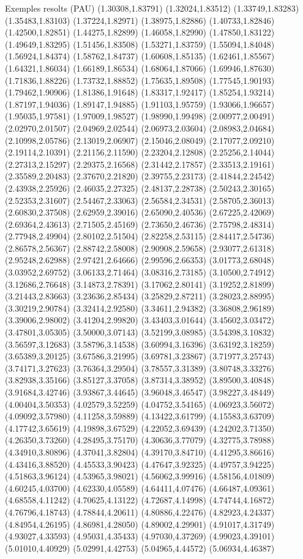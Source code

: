\documentclass[11pt,a4paper]{article}
\begin{document}
\begin{fmex}{Exemples resolts (PAU)}
(1.30308,1.83791) (1.32024,1.83512) (1.33749,1.83283) (1.35483,1.83103) (1.37224,1.82971) (1.38975,1.82886) (1.40733,1.82846) (1.42500,1.82851) (1.44275,1.82899) (1.46058,1.82990) (1.47850,1.83122) (1.49649,1.83295) (1.51456,1.83508) (1.53271,1.83759) (1.55094,1.84048) (1.56924,1.84374) (1.58762,1.84737) (1.60608,1.85135) (1.62461,1.85567) (1.64321,1.86034) (1.66189,1.86534) (1.68064,1.87066) (1.69946,1.87630) (1.71836,1.88226) (1.73732,1.88852) (1.75635,1.89508) (1.77545,1.90193) (1.79462,1.90906) (1.81386,1.91648) (1.83317,1.92417) (1.85254,1.93214) (1.87197,1.94036) (1.89147,1.94885) (1.91103,1.95759) (1.93066,1.96657) (1.95035,1.97581) (1.97009,1.98527) (1.98990,1.99498) (2.00977,2.00491) (2.02970,2.01507) (2.04969,2.02544) (2.06973,2.03604) (2.08983,2.04684) (2.10998,2.05786) (2.13019,2.06907) (2.15046,2.08049) (2.17077,2.09210) (2.19114,2.10391) (2.21156,2.11590) (2.23204,2.12808) (2.25256,2.14044) (2.27313,2.15297) (2.29375,2.16568) (2.31442,2.17857) (2.33513,2.19161) (2.35589,2.20483) (2.37670,2.21820) (2.39755,2.23173) (2.41844,2.24542) (2.43938,2.25926) (2.46035,2.27325) (2.48137,2.28738) (2.50243,2.30165) (2.52353,2.31607) (2.54467,2.33063) (2.56584,2.34531) (2.58705,2.36013) (2.60830,2.37508) (2.62959,2.39016) (2.65090,2.40536) (2.67225,2.42069) (2.69364,2.43613) (2.71505,2.45169) (2.73650,2.46736) (2.75798,2.48314) (2.77948,2.49904) (2.80102,2.51504) (2.82258,2.53115) (2.84417,2.54736) (2.86578,2.56367) (2.88742,2.58008) (2.90908,2.59658) (2.93077,2.61318) (2.95248,2.62988) (2.97421,2.64666) (2.99596,2.66353) (3.01773,2.68048) (3.03952,2.69752) (3.06133,2.71464) (3.08316,2.73185) (3.10500,2.74912) (3.12686,2.76648) (3.14873,2.78391) (3.17062,2.80141) (3.19252,2.81899) (3.21443,2.83663) (3.23636,2.85434) (3.25829,2.87211) (3.28023,2.88995) (3.30219,2.90784) (3.32414,2.92580) (3.34611,2.94382) (3.36808,2.96189) (3.39006,2.98002) (3.41204,2.99820) (3.43403,3.01644) (3.45602,3.03472) (3.47801,3.05305) (3.50000,3.07143) (3.52199,3.08985) (3.54398,3.10832) (3.56597,3.12683) (3.58796,3.14538) (3.60994,3.16396) (3.63192,3.18259) (3.65389,3.20125) (3.67586,3.21995) (3.69781,3.23867) (3.71977,3.25743) (3.74171,3.27623) (3.76364,3.29504) (3.78557,3.31389) (3.80748,3.33276) (3.82938,3.35166) (3.85127,3.37058) (3.87314,3.38952) (3.89500,3.40848) (3.91684,3.42746) (3.93867,3.44645) (3.96048,3.46547) (3.98227,3.48449) (4.00404,3.50353) (4.02579,3.52259) (4.04752,3.54165) (4.06923,3.56072) (4.09092,3.57980) (4.11258,3.59889) (4.13422,3.61799) (4.15583,3.63709) (4.17742,3.65619) (4.19898,3.67529) (4.22052,3.69439) (4.24202,3.71350) (4.26350,3.73260) (4.28495,3.75170) (4.30636,3.77079) (4.32775,3.78988) (4.34910,3.80896) (4.37041,3.82804) (4.39170,3.84710) (4.41295,3.86616) (4.43416,3.88520) (4.45533,3.90423) (4.47647,3.92325) (4.49757,3.94225) (4.51863,3.96124) (4.53965,3.98021) (4.56062,3.99916) (4.58156,4.01809) (4.60245,4.03700) (4.62330,4.05589) (4.64411,4.07476) (4.66487,4.09361) (4.68558,4.11242) (4.70625,4.13122) (4.72687,4.14998) (4.74744,4.16872) (4.76796,4.18743) (4.78844,4.20611) (4.80886,4.22476) (4.82923,4.24337) (4.84954,4.26195) (4.86981,4.28050) (4.89002,4.29901) (4.91017,4.31749) (4.93027,4.33593) (4.95031,4.35433) (4.97030,4.37269) (4.99023,4.39101) (5.01010,4.40929) (5.02991,4.42753) (5.04965,4.44572) (5.06934,4.46387) 
\end{fmex}
\end{document}

